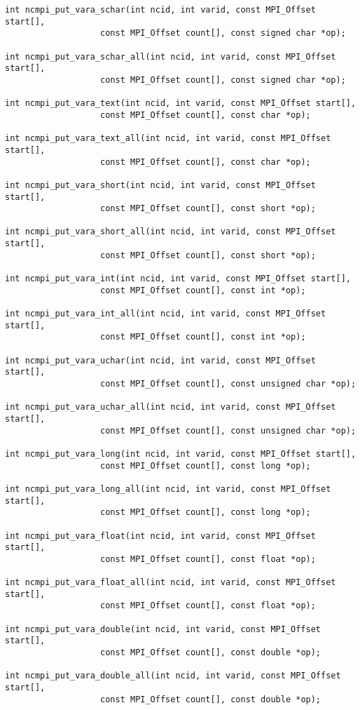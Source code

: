 \begin{verbatim}
int ncmpi_put_vara_schar(int ncid, int varid, const MPI_Offset start[],
                   const MPI_Offset count[], const signed char *op);

int ncmpi_put_vara_schar_all(int ncid, int varid, const MPI_Offset start[],
                   const MPI_Offset count[], const signed char *op);

int ncmpi_put_vara_text(int ncid, int varid, const MPI_Offset start[],
                   const MPI_Offset count[], const char *op);

int ncmpi_put_vara_text_all(int ncid, int varid, const MPI_Offset start[],
                   const MPI_Offset count[], const char *op);

int ncmpi_put_vara_short(int ncid, int varid, const MPI_Offset start[],
                   const MPI_Offset count[], const short *op);

int ncmpi_put_vara_short_all(int ncid, int varid, const MPI_Offset start[],
                   const MPI_Offset count[], const short *op);

int ncmpi_put_vara_int(int ncid, int varid, const MPI_Offset start[],
                   const MPI_Offset count[], const int *op);

int ncmpi_put_vara_int_all(int ncid, int varid, const MPI_Offset start[],
                   const MPI_Offset count[], const int *op);

int ncmpi_put_vara_uchar(int ncid, int varid, const MPI_Offset start[],
                   const MPI_Offset count[], const unsigned char *op);

int ncmpi_put_vara_uchar_all(int ncid, int varid, const MPI_Offset start[],
                   const MPI_Offset count[], const unsigned char *op);

int ncmpi_put_vara_long(int ncid, int varid, const MPI_Offset start[],
                   const MPI_Offset count[], const long *op);

int ncmpi_put_vara_long_all(int ncid, int varid, const MPI_Offset start[],
                   const MPI_Offset count[], const long *op);

int ncmpi_put_vara_float(int ncid, int varid, const MPI_Offset start[],
                   const MPI_Offset count[], const float *op);

int ncmpi_put_vara_float_all(int ncid, int varid, const MPI_Offset start[],
                   const MPI_Offset count[], const float *op);

int ncmpi_put_vara_double(int ncid, int varid, const MPI_Offset start[],
                   const MPI_Offset count[], const double *op);

int ncmpi_put_vara_double_all(int ncid, int varid, const MPI_Offset start[],
                   const MPI_Offset count[], const double *op);
\end{verbatim}


